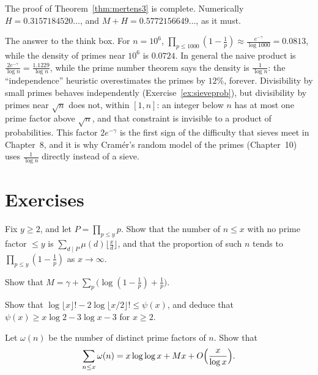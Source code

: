 The proof of Theorem~\ref{thm:mertens3} is complete. Numerically $H=0.3157184520\ldots$, and $M+H=0.5772156649\ldots$, as it must.

\begin{beauty}
The answer to the think box. For $n=10^6$, $\prod_{p\le1000}(1-\frac1p)\approx\frac{e^{-\gamma}}{\log1000}=0.0813$, while the density of primes near $10^6$ is $0.0724$.
In general the naive product is $\frac{2e^{-\gamma}}{\log n}=\frac{1.1229}{\log n}$, while the prime number theorem says the density is $\frac1{\log n}$: the
``independence'' heuristic overestimates the primes by $12\%$, forever. Divisibility by small primes behaves independently (Exercise~\ref{ex:sieveprob}),
but divisibility by primes near $\sqrt n$ does not, within $[1,n]$: an integer below $n$ has at most one prime factor above $\sqrt n$, and that constraint
is invisible to a product of probabilities. This factor $2e^{-\gamma}$ is the first sign of the difficulty that sieves meet in Chapter~8, and it is why
Cram\'er's random model of the primes (Chapter~10) uses $\frac1{\log n}$ directly instead of a sieve.
\end{beauty}

\section{Exercises}

\begin{exercise}[$\star$]\label{ex:sieveprob}
Fix $y\ge2$, and let $P=\prod_{p\le y}p$. Show that the number of $n\le x$ with no prime factor $\le y$ is $\sum_{d\mid P}\mu(d)\lfloor\frac xd\rfloor$, and that the
proportion of such $n$ tends to $\prod_{p\le y}(1-\frac1p)$ as $x\to\infty$.
\end{exercise}

\begin{exercise}[$\star$]\label{ex:mertensconst}
Show that $M=\gamma+\sum_p\bigl(\log(1-\frac1p)+\frac1p\bigr)$.
\end{exercise}

\begin{exercise}[$\star\star$]\label{ex:chebyshevlower}
Show that $\log\lfloor x\rfloor!-2\log\lfloor x/2\rfloor!\le\psi(x)$, and deduce that $\psi(x)\ge x\log2-3\log x-3$ for $x\ge2$.
\end{exercise}

\begin{exercise}[$\star\star$]\label{ex:averageomega}
Let $\omega(n)$ be the number of distinct prime factors of $n$. Show that
\[
\sum_{n\le x}\omega(n)=x\log\log x+Mx+O\Bigl(\frac x{\log x}\Bigr).
\]
\end{exercise}

